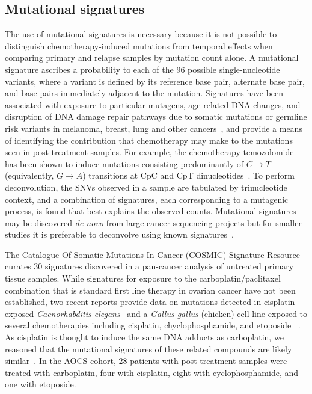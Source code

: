 \documentclass{bmcart}
\begin{document}
\subsection*{Mutational signatures}
The use of mutational signatures is necessary because it is not possible to distinguish chemotherapy-induced mutations from temporal effects when comparing primary and relapse samples by mutation count alone. A mutational signature ascribes a probability to each of the 96 possible single-nucleotide variants, where a variant is defined by its reference base pair, alternate base pair, and base pairs immediately adjacent to the mutation. Signatures have been associated with exposure to particular mutagens, age related DNA changes, and disruption of DNA damage repair pathways due to somatic mutations or germline risk variants in melanoma, breast, lung and other cancers~\cite{Alexandrov2013}, and provide a means of identifying the contribution that chemotherapy may make to the mutations seen in post-treatment samples. For example, the chemotherapy temozolomide has been shown to induce mutations consisting predominantly of $C \rightarrow T$ (equivalently, $G \rightarrow A$) transitions at CpC and CpT dinucleotides~\cite{Johnson_2013}. To perform deconvolution, the SNVs observed in a sample are tabulated by trinucleotide context, and a combination of signatures, each corresponding to a mutagenic process, is found that best explains the observed counts. Mutational signatures may be discovered \textit{de novo} from large cancer sequencing projects but for smaller studies it is preferable to deconvolve using known signatures~\cite{Rosenthal_2016}.

The Catalogue Of Somatic Mutations In Cancer (COSMIC) Signature Resource curates 30 signatures discovered in a pan-cancer analysis of untreated primary tissue samples. While signatures for exposure to the carboplatin/paclitaxel combination that is standard first line therapy in ovarian cancer have not been established, two recent reports provide data on mutations detected in cisplatin-exposed \textit{Caenorhabditis elegans}~\cite{Meier_2014} and a \textit{Gallus gallus} (chicken) cell line exposed to several chemotherapies including cisplatin, chyclophosphamide, and etoposide ~\cite{Szikriszt_2016}. As cisplatin is thought to induce the same DNA adducts as carboplatin, we reasoned that the mutational signatures of these related compounds are likely similar~\cite{Atsushi19941009}. In the AOCS cohort, 28 patients with post-treatment samples were treated with carboplatin, four with cisplatin, eight with cyclophosphamide, and one with etoposide.
\end{document}
